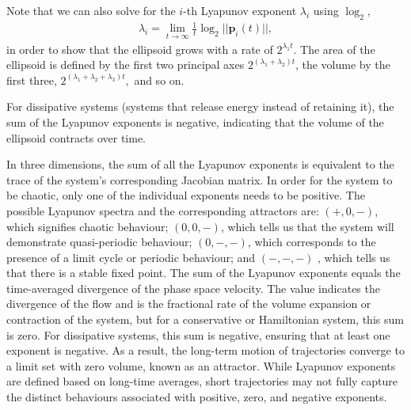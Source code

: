 Note that we can also solve for the $i$-th Lyapunov exponent $\lambda_i$ using $\log_2,$
\begin{align}
    \lambda_i = \lim_{t \to \infty} \frac{1}{t} \log_2 ||\mathbf{p}_i(t)||, \label{eq:continuous}
\end{align}
in order to show that the ellipsoid grows with a rate of $2^{\lambda_1t}$. The area of the ellipsoid is defined by the first two principal axes $2^{(\lambda_1+\lambda_2)t}$, the volume by the first three, $2^{(\lambda_1+\lambda_2+\lambda_3)t},$ and so on. \cite{continuouslyapunov}

For dissipative systems (systems that release energy instead of retaining it), the sum of the Lyapunov exponents is negative, indicating that the volume of the ellipsoid contracts over time.

In three dimensions, the sum of all the Lyapunov exponents is equivalent to the trace of the system's corresponding Jacobian matrix. 
In order for the system to be chaotic, only one of the individual exponents needs to be positive.
The possible Lyapunov spectra and the corresponding attractors are: $(+,0,-)$, which signifies chaotic behaviour; $(0,0,-)$, which tells us that the system will demonstrate quasi-periodic behaviour;
$(0,-,-)$, which corresponds to the presence of a limit cycle or periodic behaviour; and $(-,-,-)$ , which tells us that there is a stable fixed point. 
The sum of the Lyapunov exponents equals the time-averaged divergence of the phase space velocity. 
The value indicates the divergence of the flow and is the fractional rate of the volume expansion or contraction of the system, but for a conservative or Hamiltonian system, this sum is zero. 
For dissipative systems, this sum is negative, ensuring that at least one exponent is negative. 
As a result, the long-term motion of trajectories converge to a limit set with zero volume, known as an attractor. 
While Lyapunov exponents are defined based on long-time averages, short trajectories may not fully capture the distinct behaviours associated with positive, zero, and negative exponents. \cite{continuouslyapunov}



